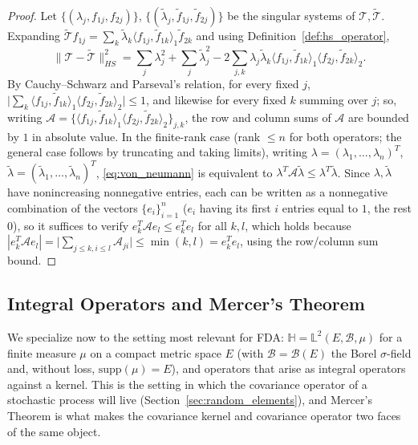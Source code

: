 \begin{proof}
Let $\{(\lambda_j,f_{1j},f_{2j})\}$, $\{(\widetilde\lambda_j,
\widetilde{f}_{1j},\widetilde{f}_{2j})\}$ be the singular systems of
$\mathcal{T},\widetilde{\mathcal{T}}$. Expanding $\widetilde{\mathcal{T}}
f_{1j} = \sum_k\widetilde\lambda_k\langle f_{1j},\widetilde{f}_{1k}
\rangle_1\widetilde{f}_{2k}$ and using Definition~\ref{def:hs_operator},
\[
\|\mathcal{T}-\widetilde{\mathcal{T}}\|_{HS}^2 = \sum_j\lambda_j^2 +
\sum_j\widetilde\lambda_j^2 - 2\sum_{j,k}\lambda_j\widetilde\lambda_k
\langle f_{1j},\widetilde{f}_{1k}\rangle_1\langle f_{2j},
\widetilde{f}_{2k}\rangle_2.
\]
By Cauchy--Schwarz and Parseval's relation, for every fixed $j$,
$\big|\sum_k\langle f_{1j},\widetilde{f}_{1k}\rangle_1\langle f_{2j},
\widetilde{f}_{2k}\rangle_2\big|\leq 1$, and likewise for every fixed $k$
summing over $j$; so, writing $\mathcal{A}=\{\langle f_{1j},
\widetilde{f}_{1k}\rangle_1\langle f_{2j},\widetilde{f}_{2k}\rangle_2\}
_{j,k}$, the row and column sums of $\mathcal{A}$ are bounded by $1$ in
absolute value. In the finite-rank case (rank $\leq n$ for both operators;
the general case follows by truncating and taking limits), writing
$\lambda=(\lambda_1,\dots,\lambda_n)^T$,
$\widetilde\lambda=(\widetilde\lambda_1,\dots,\widetilde\lambda_n)^T$,
\eqref{eq:von_neumann} is equivalent to $\lambda^T\mathcal{A}
\widetilde\lambda \leq \lambda^T\widetilde\lambda$. Since $\lambda,
\widetilde\lambda$ have nonincreasing nonnegative entries, each can be
written as a nonnegative combination of the vectors $\{e_i\}_{i=1}^n$
($e_i$ having its first $i$ entries equal to $1$, the rest $0$), so it
suffices to verify $e_k^T\mathcal{A}e_l \leq e_k^Te_l$ for all $k,l$, which
holds because $|e_k^T\mathcal{A}e_l| = \big|\sum_{j\leq k,i\leq l}
\mathcal{A}_{ji}\big|\leq\min(k,l)=e_k^Te_l$, using the row/column sum
bound.
\end{proof}

\subsection{Integral Operators and Mercer's Theorem}
\label{subsec:mercer}

We specialize now to the setting most relevant for FDA: $\mathbb{H} =
\mathbb{L}^2(E,\mathcal{B},\mu)$ for a finite measure $\mu$ on a compact
metric space $E$ (with $\mathcal{B}=\mathcal{B}(E)$ the Borel
$\sigma$-field and, without loss, $\mathrm{supp}(\mu)=E$), and operators
that arise as integral operators against a kernel. This is the setting in
which the covariance operator of a stochastic process will live
(Section~\ref{sec:random_elements}), and Mercer's Theorem is what makes the
covariance kernel and covariance operator two faces of the same object.

